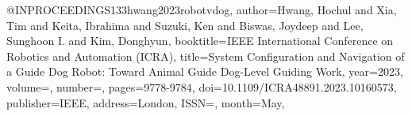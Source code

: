 @INPROCEEDINGS{133hwang2023robotvdog,
author={Hwang, Hochul and Xia, Tim and Keita, Ibrahima and Suzuki, Ken and Biswas, Joydeep and Lee, Sunghoon I. and Kim, Donghyun},
booktitle={IEEE International Conference on Robotics and Automation (ICRA)}, 
title={System Configuration and Navigation of a Guide Dog Robot: Toward Animal Guide Dog-Level Guiding Work}, 
year={2023},
volume={},
number={},
pages={9778-9784},
doi={10.1109/ICRA48891.2023.10160573},
publisher={IEEE},
address={London},
ISSN={},
month={May},}